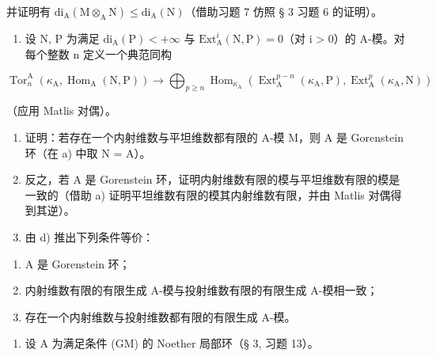 并证明有 \(\mathrm{di}_{\mathrm{A}}(\mathrm{M}\otimes_{\mathrm{A}}\mathrm{N})\leqslant \mathrm{di}_{\mathrm{A}}(\mathrm{N})\)（借助习题 7 仿照 § 3 习题 6 的证明）。

\begin{enumerate}
\def\labelenumi{\alph{enumi})}
\setcounter{enumi}{1}
\tightlist
\item
  设 N, P 为满足 \(\mathrm{di}_{\mathrm{A}}(\mathrm{P}) < +\infty\) 与 \(\mathrm{Ext}_{\mathrm{A}}^{i}(\mathrm{N},\mathrm{P}) = 0\)（对 i \textgreater{} 0）的 A-模。对每个整数 n 定义一个典范同构
\end{enumerate}

\[
\operatorname{Tor} _ {n} ^ {\mathrm{A}} \left(\kappa_ {\mathrm{A}}, \operatorname{Hom} _ {\mathrm{A}} (\mathrm{N}, \mathrm{P})\right) \longrightarrow \bigoplus_ {p \geqslant n} \operatorname{Hom} _ {\kappa_ {\mathrm{A}}} \left(\operatorname{Ext} _ {\mathrm{A}} ^ {p - n} \left(\kappa_ {\mathrm{A}}, \mathrm{P}\right), \operatorname{Ext} _ {\mathrm{A}} ^ {p} \left(\kappa_ {\mathrm{A}}, \mathrm{N}\right)\right)
\]

（应用 Matlis 对偶）。

\begin{enumerate}
\def\labelenumi{\alph{enumi})}
\setcounter{enumi}{2}
\item
  证明：若存在一个内射维数与平坦维数都有限的 A-模 M，则 A 是 Gorenstein 环（在 a) 中取 N = A）。
\item
  反之，若 A 是 Gorenstein 环，证明内射维数有限的模与平坦维数有限的模是一致的（借助 a) 证明平坦维数有限的模其内射维数有限，并由 Matlis 对偶得到其逆）。
\item
  由 d) 推出下列条件等价：
\end{enumerate}

\begin{enumerate}
\def\labelenumi{(\roman{enumi})}
\item
  A 是 Gorenstein 环；
\item
  内射维数有限的有限生成 A-模与投射维数有限的有限生成 A-模相一致；
\item
  存在一个内射维数与投射维数都有限的有限生成 A-模。
\end{enumerate}

\begin{enumerate}
\def\labelenumi{\arabic{enumi})}
\setcounter{enumi}{8}
\tightlist
\item
  设 A 为满足条件 (GM) 的 Noether 局部环（§ 3, 习题 13）。
\end{enumerate}

